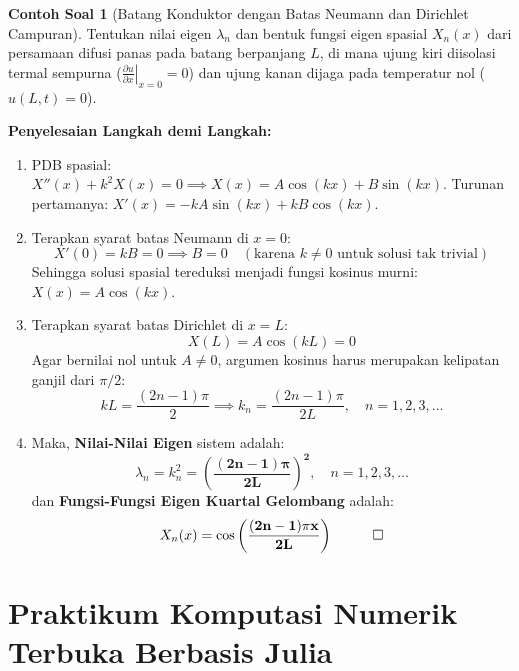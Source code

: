 \documentclass[11pt,a4paper]{article}
\theoremstyle{definition}
\newtheorem{example}{Contoh Soal}[section]
\begin{document}
\begin{example}[Batang Konduktor dengan Batas Neumann dan Dirichlet Campuran]
Tentukan nilai eigen $\lambda_n$ dan bentuk fungsi eigen spasial $X_n(x)$ dari persamaan difusi panas pada batang berpanjang $L$, di mana ujung kiri diisolasi termal sempurna ($\left.\frac{\partial u}{\partial x}\right|_{x=0} = 0$) dan ujung kanan dijaga pada temperatur nol ($u(L, t) = 0$).
\end{example}

\noindent\textbf{Penyelesaian Langkah demi Langkah:}
\begin{enumerate}[leftmargin=*]
    \item PDB spasial: $X''(x) + k^2 X(x) = 0 \implies X(x) = A \cos(kx) + B \sin(kx)$.
    Turunan pertamanya: $X'(x) = -k A \sin(kx) + k B \cos(kx)$.
    \item Terapkan syarat batas Neumann di $x = 0$:
    \begin{equation*}
        X'(0) = k B = 0 \implies B = 0 \quad (\text{karena } k \ne 0 \text{ untuk solusi tak trivial})
    \end{equation*}
    Sehingga solusi spasial tereduksi menjadi fungsi kosinus murni: $X(x) = A \cos(kx)$.
    \item Terapkan syarat batas Dirichlet di $x = L$:
    \begin{equation*}
        X(L) = A \cos(kL) = 0
    \end{equation*}
    Agar bernilai nol untuk $A \ne 0$, argumen kosinus harus merupakan kelipatan ganjil dari $\pi/2$:
    \begin{equation*}
        k L = \frac{(2n - 1)\pi}{2} \implies k_n = \frac{(2n - 1)\pi}{2L}, \quad n = 1, 2, 3, \dots
    \end{equation*}
    \item Maka, \textbf{Nilai-Nilai Eigen} sistem adalah:
    \begin{equation*}
        \lambda_n = k_n^2 = \mathbf{\left( \frac{(2n - 1)\pi}{2L} \right)^2}, \quad n = 1, 2, 3, \dots
    \end{equation*}
    dan \textbf{Fungsi-Fungsi Eigen Kuartal Gelombang} adalah:
    \begin{equation*}
        X_n(x) = \mathbf{\cos\left( \frac{(2n - 1)\pi x}{2L} \right)} \quad \qed
    \end{equation*}
\end{enumerate}

\section{Praktikum Komputasi Numerik Terbuka Berbasis Julia}
\end{document}
